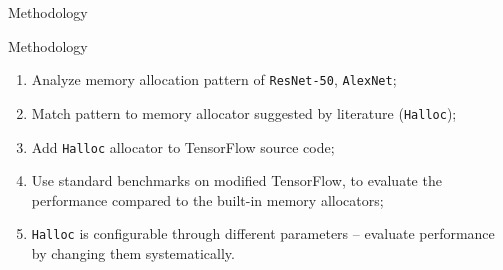 \documentclass[10pt]{beamer}
\begin{document}
%
%
%

\begin{frame}[fragile]{Methodology}


\begin{alertblock}{Methodology}
\begin{enumerate}
    \item Analyze memory allocation pattern of \texttt{ResNet-50}, \texttt{AlexNet};
    \item Match pattern to memory allocator suggested by literature (\texttt{Halloc});
    \item Add \texttt{Halloc} allocator to TensorFlow source code;
    \item Use standard benchmarks on modified TensorFlow, to evaluate the performance compared to the built-in memory allocators;
    \item \texttt{Halloc} is configurable through different parameters -- evaluate performance by changing them systematically.
    
\end{enumerate}

\end{alertblock}
\end{frame}



\end{document}
